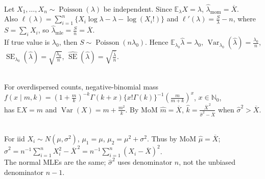 \begin{example} \label{ex:poisson-moments-likelihood-standard-error} \\
Let $X_1,\ldots,X_n\sim\operatorname{Poisson}(\lambda)$ be independent. Since $\mathbb{E}_\lambda X=\lambda$, $\widehat{\lambda}_{\mathrm{mom}}=\overline{X}$.\\
Also $\ell(\lambda)=\sum\limits_{i=1}^{n}\{X_i\log\lambda-\lambda-\log(X_i!)\}$ and $\ell'(\lambda)=\frac{S}{\lambda}-n$, where $S=\sum\limits_iX_i$, so $\widehat{\lambda}_{\mathrm{mle}}=\frac{S}{n}=\overline{X}$.\\
If true value is $\lambda_0$, then $S\sim\operatorname{Poisson}(n\lambda_0)$. Hence $\mathbb{E}_{\lambda_0}\widehat{\lambda}=\lambda_0$, $\operatorname{Var}_{\lambda_0}(\widehat{\lambda})=\frac{\lambda_0}{n}$, $\operatorname{SE}_{\lambda_0}(\widehat{\lambda})=\sqrt{\frac{\lambda_0}{n}}$, $\widehat{\operatorname{SE}}(\widehat{\lambda})=\sqrt{\frac{\widehat{\lambda}}{n}}$.
\end{example}

\begin{example} \label{ex:negative-binomial-overdispersion-estimation} \\
For overdispersed counts, negative-binomial mass $f(x\mid m,k)=(1+\frac{m}{k})^{-k}\Gamma(k+x)\{x!\Gamma(k)\}^{-1}(\frac{m}{m+k})^x$, $x\in\mathbb{N}_0$,\\
has $\mathbb{E}X=m$ and $\operatorname{Var}(X)=m+\frac{m^2}{k}$. By MoM $\widehat{m}=\overline{X}$, $\widehat{k}=\frac{\overline{X}^{\,2}}{\widehat{\sigma}^2-\overline{X}}$ when $\widehat{\sigma}^2>\overline{X}$.
\end{example}

\begin{example} \label{ex:normal-moments-and-mle} \\
For iid $X_i\sim N(\mu,\sigma^2)$, $\mu_1=\mu$, $\mu_2=\mu^2+\sigma^2$. Thus by MoM $\widehat{\mu}=\overline{X}$; $\widehat{\sigma}^2=n^{-1}\sum\limits_{i=1}^{n}X_i^2-\overline{X}^{\,2}=n^{-1}\sum\limits_{i=1}^{n}(X_i-\overline{X})^2$.\\
The normal MLEs are the same; $\widehat{\sigma}^2$ uses denominator $n$, not the unbiased denominator $n-1$.
\end{example}

